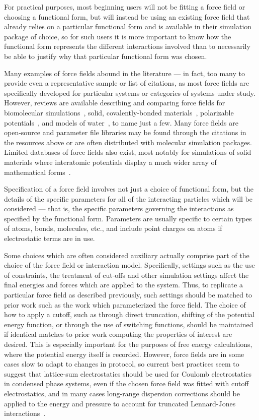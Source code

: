 \documentclass[9pt,bestpractices]{livecoms}
\begin{document}
For practical purposes, most beginning users will not be fitting a force field or choosing a functional form, but will instead be using an existing force field that already relies on a particular functional form and is available in their simulation package of choice, so for such users it is more important to know how the functional form represents the different interactions involved than to necessarily be able to justify why that particular functional form was chosen.

Many examples of force fields abound in the literature --- in fact, too many to provide even a representative sample or list of citations, as most force fields are specifically developed for particular systems or categories of systems under study.
However, reviews are available describing and comparing force fields for biomolecular simulations~\citep{Ponder2003, Riniker2018}, solid, covalently-bonded materials~\citep{Mishra2017}, polarizable potentials~\citep{Lopes2009}, and models of water~\citep{Onufriev2018, Vega2011}, to name just a few.
Many force fields are open-source and parameter file libraries may be found through the citations in the resources above or are often distributed with molecular simulation packages.
Limited databases of force fields also exist, most notably for simulations of solid materials where interatomic potentials display a much wider array of mathematical forms~\citep{openKIM, IPRnist}.

Specification of a force field involves not just a choice of functional form, but the details of the specific parameters for all of the interacting particles which will be considered --- that is, the specific parameters governing the interactions as specified by the functional form.
Parameters are usually specific to certain types of atoms, bonds, molecules, etc., and include point charges on atoms if electrostatic terms are in use.

Some choices which are often considered auxiliary actually comprise part of the choice of the force field or interaction model.
Specifically, settings such as the use of constraints, the treatment of cut-offs and other simulation settings affect the final energies and forces which are applied to the system.
Thus, to replicate a particular force field as described previously, such settings should be matched to prior work such as the work which parameterized the force field.
The choice of how to apply a cutoff, such as through direct truncation, shifting of the potential energy function, or through the use of switching functions, should be maintained if identical matches to prior work computing the properties of interest are desired.
This is especially important for the purposes of free energy calculations, where the potential energy itself is recorded.
However, force fields are in some cases slow to adapt to changes in protocol, so current best practices seem to suggest that lattice-sum electrostatics should be used for Coulomb electrostatics in condensed phase systems, even if the chosen force field was fitted with cutoff electrostatics, and in many cases long-range dispersion corrections should be applied to the energy and pressure to account for truncated Lennard-Jones interactions~\cite{Shirts:2007:JPhysChemB,Isele-Holder:2012:JChemPhys}.
\end{document}
